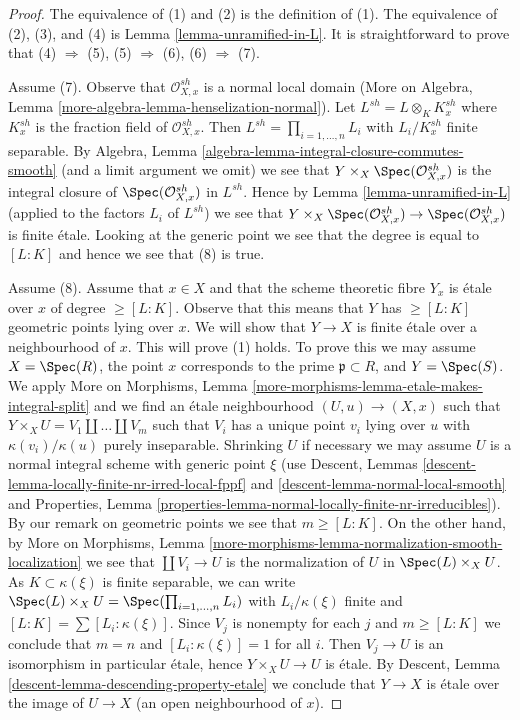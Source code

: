 \begin{proof}
The equivalence of (1) and (2) is the definition of (1).
The equivalence of (2), (3), and (4) is Lemma \ref{lemma-unramified-in-L}.
It is straightforward to prove that (4) $\Rightarrow$ (5),
(5) $\Rightarrow$ (6), (6) $\Rightarrow$ (7).

\medskip\noindent
Assume (7). Observe that $\mathcal{O}_{X, x}^{sh}$ is a normal local domain
(More on Algebra, Lemma \ref{more-algebra-lemma-henselization-normal}).
Let $L^{sh} = L \otimes_K K_x^{sh}$ where $K_x^{sh}$ is the fraction field
of $\mathcal{O}_{X, x}^{sh}$. Then $L^{sh} = \prod_{i = 1, \ldots, n} L_i$
with $L_i/K_x^{sh}$ finite separable. By
Algebra, Lemma \ref{algebra-lemma-integral-closure-commutes-smooth}
(and a limit argument we omit)
we see that $Y \times_X \Spec(\mathcal{O}_{X, x}^{sh})$
is the integral closure of $\Spec(\mathcal{O}_{X, x}^{sh})$ in $L^{sh}$.
Hence by Lemma \ref{lemma-unramified-in-L} (applied to the factors
$L_i$ of $L^{sh}$) we see that
$Y \times_X \Spec(\mathcal{O}_{X, x}^{sh}) \to \Spec(\mathcal{O}_{X, x}^{sh})$
is finite \'etale. Looking at the generic point we see that
the degree is equal to $[L : K]$ and hence we see that (8) is true.

\medskip\noindent
Assume (8). Assume that $x \in X$ and that the scheme theoretic fibre $Y_x$
is \'etale over $x$ of degree $\geq [L : K]$. Observe that this means
that $Y$ has $\geq [L : K]$ geometric points lying over $x$.
We will show that $Y \to X$ is finite \'etale over a neighbourhood of $x$.
This will prove (1) holds.
To prove this we may assume $X = \Spec(R)$, the point $x$ corresponds to
the prime $\mathfrak p \subset R$, and $Y = \Spec(S)$. We apply
More on Morphisms,
Lemma \ref{more-morphisms-lemma-etale-makes-integral-split} and we find an
\'etale neighbourhood $(U, u) \to (X, x)$ such that
$Y \times_X U = V_1 \amalg \ldots \amalg V_m$ such that $V_i$
has a unique point $v_i$ lying over $u$ with $\kappa(v_i)/\kappa(u)$
purely inseparable. Shrinking $U$ if necessary we may assume $U$ is
a normal integral scheme with generic point $\xi$ (use
Descent, Lemmas \ref{descent-lemma-locally-finite-nr-irred-local-fppf} and
\ref{descent-lemma-normal-local-smooth} and
Properties, Lemma \ref{properties-lemma-normal-locally-finite-nr-irreducibles}).
By our remark on geometric points we see that $m \geq [L : K]$.
On the other hand, by More on Morphisms, Lemma
\ref{more-morphisms-lemma-normalization-smooth-localization}
we see that $\coprod V_i \to U$ is the normalization of $U$ in
$\Spec(L) \times_X U$. As $K \subset \kappa(\xi)$ is finite separable,
we can write $\Spec(L) \times_X U = \Spec(\prod_{i = 1, \ldots, n} L_i)$
with $L_i/\kappa(\xi)$ finite and $[L : K] = \sum [L_i : \kappa(\xi)]$.
Since $V_j$ is nonempty for each $j$ and $m \geq [L : K]$
we conclude that $m = n$ and $[L_i : \kappa(\xi)] = 1$
for all $i$. Then $V_j \to U$ is an isomorphism in particular
\'etale, hence $Y \times_X U \to U$ is \'etale. By
Descent, Lemma \ref{descent-lemma-descending-property-etale}
we conclude that $Y \to X$ is \'etale over the
image of $U \to X$ (an open neighbourhood of $x$).


\end{proof}
